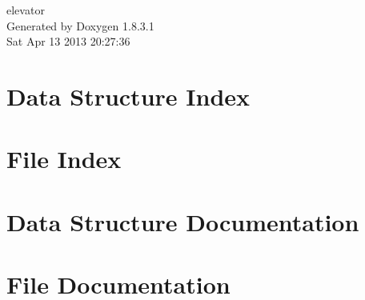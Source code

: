 \documentclass{book}
\begin{document}
\hypersetup{pageanchor=false,citecolor=blue}
\begin{titlepage}
\vspace*{7cm}
\begin{center}
{\Large elevator }\\
\vspace*{1cm}
{\large Generated by Doxygen 1.8.3.1}\\
\vspace*{0.5cm}
{\small Sat Apr 13 2013 20:27:36}\\
\end{center}
\end{titlepage}
\clearemptydoublepage
{}
\tableofcontents
\clearemptydoublepage
{}
\hypersetup{pageanchor=true,citecolor=blue}
\chapter{Data Structure Index}

\chapter{File Index}

\chapter{Data Structure Documentation}














\chapter{File Documentation}
























\printindex
\end{document}
